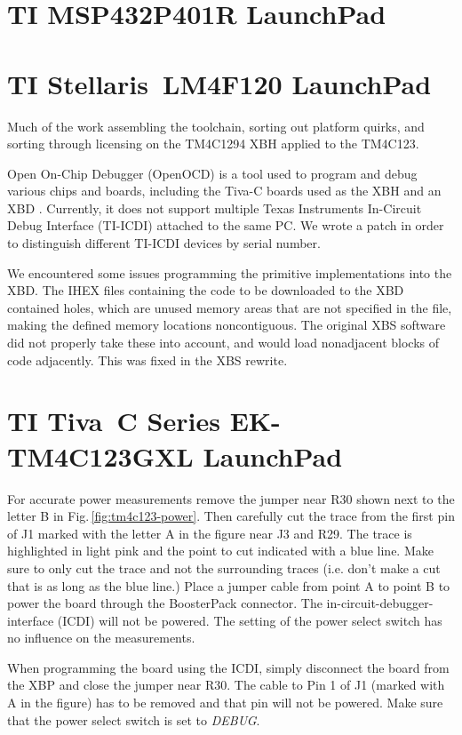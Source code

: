 \documentclass[twoside,11pt]{cergdoc}
\begin{document}
  \section{TI MSP432P401R LaunchPad\texttrademark}
  \section{TI Stellaris\textregistered~LM4F120 LaunchPad}
Much of the work assembling the toolchain, sorting out platform quirks, and
sorting through licensing on the TM4C1294 XBH applied to the TM4C123.

Open On-Chip Debugger (OpenOCD) is a tool used to program and debug various
chips and boards, including the Tiva-C boards used as the XBH and an XBD
\cite{openocd}. Currently, it does not support multiple Texas Instruments
In-Circuit Debug Interface (TI-ICDI) attached to the
same PC. We wrote a patch \cite{openocd_patch} in order to distinguish different
TI-ICDI devices by serial number. 

We encountered some issues programming the primitive implementations into the
XBD. The IHEX files containing the code to be downloaded to the XBD contained holes, which
are unused memory areas that are not specified in the file, making the defined
memory locations noncontiguous. The original XBS software did not properly take
these into account, and would load nonadjacent blocks of code adjacently. This
was fixed in the XBS rewrite. 

  \section{TI Tiva\texttrademark~C Series EK-TM4C123GXL LaunchPad}
For accurate power measurements remove the jumper near R30 shown next to the letter B in Fig.\,\ref{fig:tm4c123-power}. 
Then carefully cut the trace from the first pin of J1 marked with the letter A in the figure near J3 and R29.
The trace is highlighted in light pink and the point to cut indicated with a blue line.
Make sure to only cut the trace and not the surrounding traces (i.e. don't make a cut that is as long as
the blue line.) Place a jumper cable from point A to point B to power the board through the 
BoosterPack connector. The in-circuit-debugger-interface (ICDI) will not be powered. 
The setting of the power select switch has no influence on the measurements.

When programming the board using the ICDI, simply disconnect the board from the XBP and close the jumper
near R30. The cable to Pin 1 of J1 (marked with A in the figure) has to be removed and that pin 
will not be powered. Make sure that the power select switch is set to \emph{DEBUG}.
\end{document}

